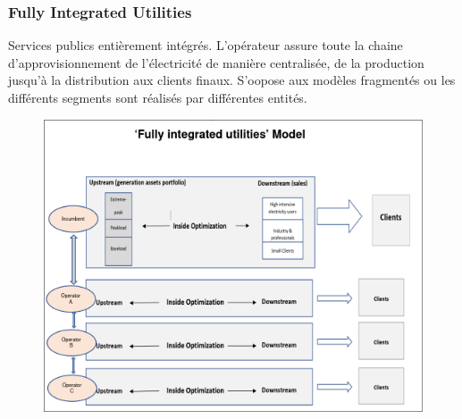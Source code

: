 \subsubsection{Fully Integrated Utilities}
Services publics entièrement intégrés. L'opérateur assure toute la chaine d'approvisionnement de l'électricité de manière centralisée, de la production jusqu'à la distribution aux clients finaux. S'oopose aux modèles fragmentés ou les différents segments sont réalisés par différentes entités.
\begin{figure}[hbt!]
    \centering
    \includegraphics[scale=0.7]{Pics/Fully_integrated_model.png}
\end{figure}
\newpage
